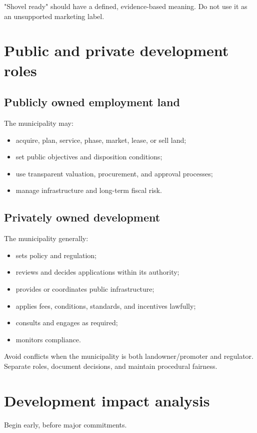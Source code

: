 \documentclass[11pt,letterpaper,oneside,openany]{book}
\begin{document}
"Shovel ready" should have a defined, evidence-based meaning. Do not use it as an unsupported marketing label.


\section[Public and private development roles]{Public and private development roles}
\subsection[Publicly owned employment land]{Publicly owned employment land}
The municipality may:


\begin{itemize}
\item acquire, plan, service, phase, market, lease, or sell land;
\item set public objectives and disposition conditions;
\item use transparent valuation, procurement, and approval processes;
\item manage infrastructure and long-term fiscal risk.
\end{itemize}


\subsection[Privately owned development]{Privately owned development}
The municipality generally:


\begin{itemize}
\item sets policy and regulation;
\item reviews and decides applications within its authority;
\item provides or coordinates public infrastructure;
\item applies fees, conditions, standards, and incentives lawfully;
\item consults and engages as required;
\item monitors compliance.
\end{itemize}


Avoid conflicts when the municipality is both landowner/promoter and regulator. Separate roles, document decisions, and maintain procedural fairness.


\section[Development impact analysis]{Development impact analysis}
Begin early, before major commitments.
\end{document}

